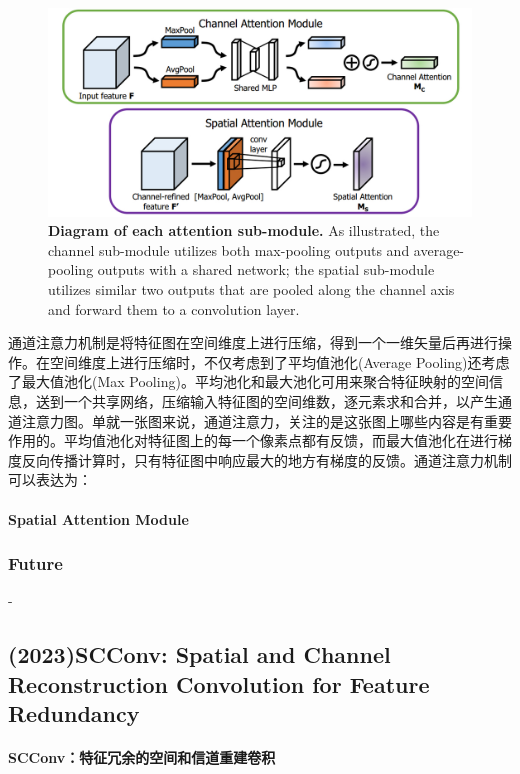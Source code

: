 \documentclass[a4paper, 10pt]{article}
\begin{document}
		\begin{figure}[htbp]
			\centering 
			\includegraphics[width=0.7\columnwidth]{picture/LLIE/CBAM/Attention Module}
			\caption{
				\label{fig: Attention Module} 
				\textbf{Diagram of each attention sub-module.} As illustrated, the channel sub-module utilizes both max-pooling outputs and average-pooling outputs with a shared network; the spatial sub-module utilizes similar two outputs that are pooled along the channel axis and forward them to a convolution layer.
			}
		\end{figure}
		
		通道注意力机制是将特征图在空间维度上进行压缩，得到一个一维矢量后再进行操作。在空间维度上进行压缩时，不仅考虑到了平均值池化(Average Pooling)还考虑了最大值池化(Max Pooling)。平均池化和最大池化可用来聚合特征映射的空间信息，送到一个共享网络，压缩输入特征图的空间维数，逐元素求和合并，以产生通道注意力图。单就一张图来说，通道注意力，关注的是这张图上哪些内容是有重要作用的。平均值池化对特征图上的每一个像素点都有反馈，而最大值池化在进行梯度反向传播计算时，只有特征图中响应最大的地方有梯度的反馈。通道注意力机制可以表达为：
		
		\paragraph{Spatial Attention Module}
		
		\subsubsection{Future}
		
		-
		
		\subsection{(2023)SCConv: Spatial and Channel Reconstruction Convolution for Feature Redundancy}
		
		\paragraph{SCConv：特征冗余的空间和信道重建卷积 }
		
\end{document}
